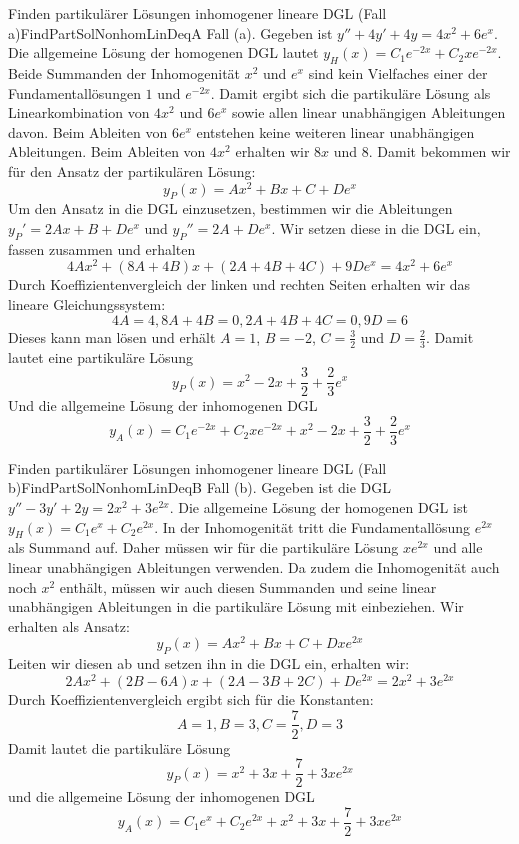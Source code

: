 \begin{example}{Finden partikulärer Lösungen inhomogener lineare DGL (Fall a)}{FindPartSolNonhomLinDeqA}
    Fall (a). Gegeben ist $y''+4y'+4y = 4x^2+6e^x$. Die allgemeine Lösung der homogenen DGL lautet $y_H(x) = C_1 e^{-2x}+ C_2 x e^{-2x}$. Beide Summanden der Inhomogenität $x^2$ und $e^x$ sind kein Vielfaches einer der Fundamentallösungen $1$ und $e^{-2x}$. Damit ergibt sich die partikuläre Lösung als Linearkombination von $4x^2$ und $6e^x$ sowie allen linear unabhängigen Ableitungen davon. Beim Ableiten von $6e^x$ entstehen keine weiteren linear unabhängigen Ableitungen. Beim Ableiten von $4x^2$ erhalten wir $8x$ und $8$. Damit bekommen wir für den Ansatz der partikulären Lösung:
    $$
        y_P(x) = Ax^2+Bx+C+De^x
    $$
    Um den Ansatz in die DGL einzusetzen, bestimmen wir die Ableitungen $y_P'=2Ax+B+De^x$ und $y_P''=2A+De^x$. Wir setzen diese in die DGL ein, fassen zusammen und erhalten
    $$
        4Ax^2+(8A+4B)x+(2A+4B+4C)+9De^x = 4x^2 + 6e^x
    $$
    Durch Koeffizientenvergleich der linken und rechten Seiten erhalten wir das lineare Gleichungssystem:
    $$
        4A = 4, 8A+4B=0, 2A+4B+4C=0, 9D=6
    $$
    Dieses kann man lösen und erhält $A=1$, $B=-2$, $C=\frac{3}{2}$ und $D=\frac{2}{3}$. Damit lautet eine partikuläre Lösung
    $$
        y_P(x) = x^2 - 2x +\frac{3}{2} + \frac{2}{3}e^x
    $$
    Und die allgemeine Lösung der inhomogenen DGL
    $$
        y_A(x) = C_1  e^{-2x} + C_2 x e^{-2x} + x^2 - 2x +\frac{3}{2} + \frac{2}{3}e^x
    $$
\end{example}

\begin{example}{Finden partikulärer Lösungen inhomogener lineare DGL (Fall b)}{FindPartSolNonhomLinDeqB}
    Fall (b). Gegeben ist die DGL $y''-3y'+2y=2x^2+3e^{2x}$. Die allgemeine Lösung der homogenen DGL ist $y_H(x) = C_1 e^x + C_2 e^{2x}$. In der Inhomogenität tritt die Fundamentallösung $e^{2x}$ als Summand auf. Daher müssen wir für die partikuläre Lösung $x e^{2x}$ und alle linear unabhängigen Ableitungen verwenden. Da zudem die Inhomogenität auch noch $x^2$ enthält, müssen wir auch diesen Summanden und seine linear unabhängigen Ableitungen in die partikuläre Lösung mit einbeziehen. Wir erhalten als Ansatz:
    $$
        y_P(x) = A x^2+Bx+C+Dxe^{2x}
    $$
    Leiten wir diesen ab und setzen ihn in die DGL ein, erhalten wir:
    $$
        2Ax^2 + (2B-6A)x + (2A-3B+2C) + De^{2x} = 2x^2 + 3e^{2x}
    $$
    Durch Koeffizientenvergleich ergibt sich für die Konstanten:
    $$
        A = 1, B=3, C=\frac{7}{2}, D=3
    $$
    Damit lautet die partikuläre Lösung
    $$
        y_P(x) = x^2+3x+\frac{7}{2}+3xe^{2x}
    $$
    und die allgemeine Lösung der inhomogenen DGL
    $$
        y_A(x) = C_1 e^x + C_2 e^{2x} + x^2+3x+\frac{7}{2}+3xe^{2x}
    $$
\end{example}

